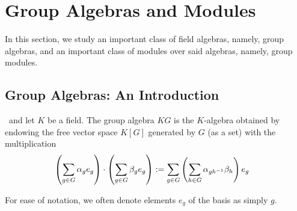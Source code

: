 \section{Group Algebras and Modules}

In this section, we study an important class of field algebras, namely, group algebras, and an important class of modules over said algebras, namely, group modules.

\subsection{Group Algebras: An Introduction}

\begin{boxdefinition}
    \ and let $K$ be a field. The group algebra $KG$ is the $K$-algebra obtained by endowing the free vector space $K[G]$ generated by $G$ (as a set) with the multiplication
    \begin{align*}
        \left( \sum_{g \in G} \alpha_g e_g \right) \cdot \left( \sum_{g \in G} \beta_g e_g \right) &:= \sum_{g \in G} \left( \sum_{h \in G} \alpha_{gh^{-1}} \beta_h \right) e_g
    \end{align*}
\end{boxdefinition}
\begin{remark}
    For ease of notation, we often denote elements $e_g$ of the basis as simply $g$.
\end{remark}